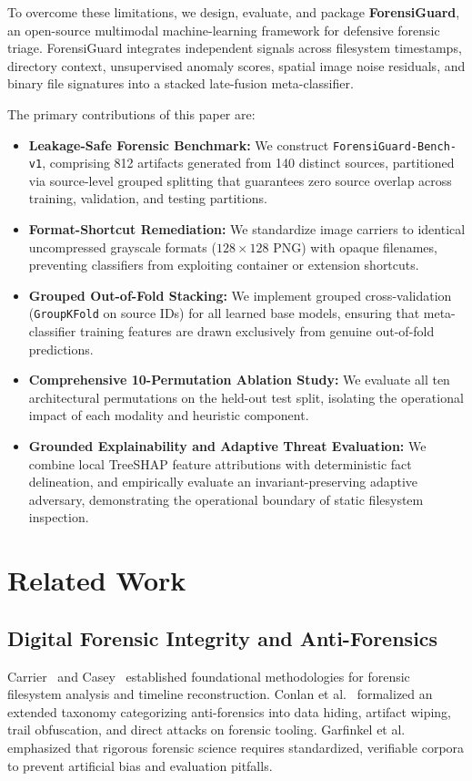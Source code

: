 \documentclass[conference]{IEEEtran}
\begin{document}
To overcome these limitations, we design, evaluate, and package \textbf{ForensiGuard}, an open-source multimodal machine-learning framework for defensive forensic triage. ForensiGuard integrates independent signals across filesystem timestamps, directory context, unsupervised anomaly scores, spatial image noise residuals, and binary file signatures into a stacked late-fusion meta-classifier.

The primary contributions of this paper are:
\begin{itemize}
    \item \textbf{Leakage-Safe Forensic Benchmark:} We construct \texttt{ForensiGuard-Bench-v1}, comprising 812 artifacts generated from 140 distinct sources, partitioned via source-level grouped splitting that guarantees zero source overlap across training, validation, and testing partitions.
    \item \textbf{Format-Shortcut Remediation:} We standardize image carriers to identical uncompressed grayscale formats ($128 \times 128$ PNG) with opaque filenames, preventing classifiers from exploiting container or extension shortcuts.
    \item \textbf{Grouped Out-of-Fold Stacking:} We implement grouped cross-validation (\texttt{GroupKFold} on source IDs) for all learned base models, ensuring that meta-classifier training features are drawn exclusively from genuine out-of-fold predictions.
    \item \textbf{Comprehensive 10-Permutation Ablation Study:} We evaluate all ten architectural permutations on the held-out test split, isolating the operational impact of each modality and heuristic component.
    \item \textbf{Grounded Explainability and Adaptive Threat Evaluation:} We combine local TreeSHAP feature attributions with deterministic fact delineation, and empirically evaluate an invariant-preserving adaptive adversary, demonstrating the operational boundary of static filesystem inspection.
\end{itemize}

\section{Related Work}
\subsection{Digital Forensic Integrity and Anti-Forensics}
Carrier~\cite{carrier2005file} and Casey~\cite{casey2011digital} established foundational methodologies for forensic filesystem analysis and timeline reconstruction. Conlan et al.~\cite{conlan2016anti} formalized an extended taxonomy categorizing anti-forensics into data hiding, artifact wiping, trail obfuscation, and direct attacks on forensic tooling. Garfinkel et al.~\cite{garfinkel2009bringing} emphasized that rigorous forensic science requires standardized, verifiable corpora to prevent artificial bias and evaluation pitfalls.
\end{document}

